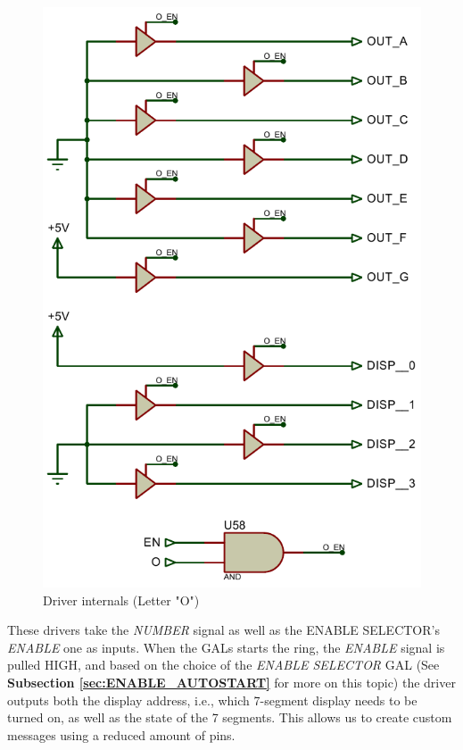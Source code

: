 \begin{figure}[H]
    \centering
    \includegraphics[scale = 0.8]{Graphics/OPEN-ERROR/OPEN-CHILD.PDF}
    \caption{Driver internals (Letter "O")}
    \label{fig:OPEN_DRIVER_CHILD}
\end{figure}

\medskip

These drivers take the \textit{NUMBER} signal as well as the ENABLE SELECTOR's \textit{ENABLE} one as inputs. When the GALs starts the ring, the \textit{ENABLE} signal is pulled HIGH, and based on the choice of the \textit{ENABLE SELECTOR} GAL (See \textbf{Subsection \ref{sec:ENABLE_AUTOSTART}} for more on this topic) the driver outputs both the display address, i.e., which 7-segment display needs to be turned on, as well as the state of the 7 segments. This allows us to create custom messages using a reduced amount of pins.\medskip

